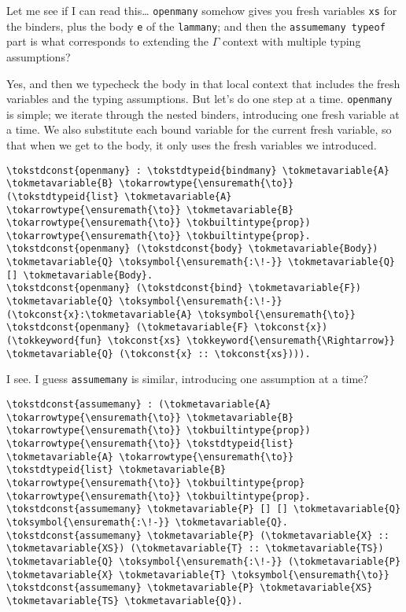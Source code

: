 \heroSTUDENT{} Let me see if I can read this\ldots{} \texttt{openmany} somehow
gives you fresh variables \texttt{xs} for the binders, plus the body
\texttt{e} of the \texttt{lammany}; and then the
\texttt{assumemany\ typeof} part is what corresponds to extending the
\(\Gamma\) context with multiple typing assumptions?

\heroADVISOR{} Yes, and then we typecheck the body in that local context that
includes the fresh variables and the typing assumptions. But let's do
one step at a time. \texttt{openmany} is simple; we iterate through the
nested binders, introducing one fresh variable at a time. We also
substitute each bound variable for the current fresh variable, so that
when we get to the body, it only uses the fresh variables we introduced.

\importantCodeblock{}

\begin{verbatim}
\tokstdconst{openmany} : \tokstdtypeid{bindmany} \tokmetavariable{A} \tokmetavariable{B} \tokarrowtype{\ensuremath{\to}} (\tokstdtypeid{list} \tokmetavariable{A} \tokarrowtype{\ensuremath{\to}} \tokmetavariable{B} \tokarrowtype{\ensuremath{\to}} \tokbuiltintype{prop}) \tokarrowtype{\ensuremath{\to}} \tokbuiltintype{prop}.
\tokstdconst{openmany} (\tokstdconst{body} \tokmetavariable{Body}) \tokmetavariable{Q} \toksymbol{\ensuremath{:\!-}} \tokmetavariable{Q} [] \tokmetavariable{Body}.
\tokstdconst{openmany} (\tokstdconst{bind} \tokmetavariable{F}) \tokmetavariable{Q} \toksymbol{\ensuremath{:\!-}} (\tokconst{x}:\tokmetavariable{A} \toksymbol{\ensuremath{\to}} \tokstdconst{openmany} (\tokmetavariable{F} \tokconst{x}) (\tokkeyword{fun} \tokconst{xs} \tokkeyword{\ensuremath{\Rightarrow}} \tokmetavariable{Q} (\tokconst{x} :: \tokconst{xs}))).
\end{verbatim}

\importantCodeblockEnd{}

\heroSTUDENT{} I see. I guess \texttt{assumemany} is similar, introducing one
assumption at a time?

\begin{verbatim}
\tokstdconst{assumemany} : (\tokmetavariable{A} \tokarrowtype{\ensuremath{\to}} \tokmetavariable{B} \tokarrowtype{\ensuremath{\to}} \tokbuiltintype{prop}) \tokarrowtype{\ensuremath{\to}} \tokstdtypeid{list} \tokmetavariable{A} \tokarrowtype{\ensuremath{\to}} \tokstdtypeid{list} \tokmetavariable{B} \tokarrowtype{\ensuremath{\to}} \tokbuiltintype{prop} \tokarrowtype{\ensuremath{\to}} \tokbuiltintype{prop}.
\tokstdconst{assumemany} \tokmetavariable{P} [] [] \tokmetavariable{Q} \toksymbol{\ensuremath{:\!-}} \tokmetavariable{Q}.
\tokstdconst{assumemany} \tokmetavariable{P} (\tokmetavariable{X} :: \tokmetavariable{XS}) (\tokmetavariable{T} :: \tokmetavariable{TS}) \tokmetavariable{Q} \toksymbol{\ensuremath{:\!-}} (\tokmetavariable{P} \tokmetavariable{X} \tokmetavariable{T} \toksymbol{\ensuremath{\to}} \tokstdconst{assumemany} \tokmetavariable{P} \tokmetavariable{XS} \tokmetavariable{TS} \tokmetavariable{Q}).
\end{verbatim}

